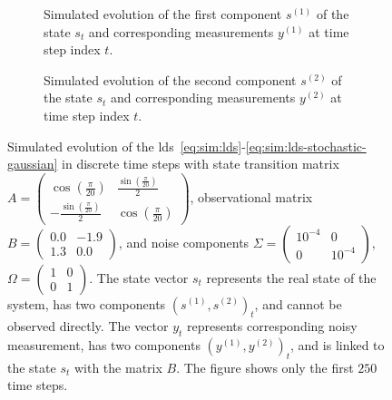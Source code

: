 \begin{figure}
  \centering
  \begin{subfigure}[t]{0.475\textwidth}
    \centering
    \caption{Simulated evolution of the first component $s^{(1)}$ of the state $s_t$ and corresponding measurements $y^{(1)}$ at time step index $t$.}
    \label{fig:sim:rotating_example_state_1}
  \end{subfigure}
  \hfill
  \begin{subfigure}[t]{0.475\textwidth}
    \centering
    \caption{Simulated evolution of the second component $s^{(2)}$ of the state $s_t$ and corresponding measurements $y^{(2)}$ at time step index $t$.}
    \label{fig:sim:rotating_example_state_2}
  \end{subfigure}
  \hfill
  \caption{
    Simulated evolution of the \ac{lds}~\eqref{eq:sim:lds}-\eqref{eq:sim:lds-stochastic-gaussian} in discrete time steps with state transition matrix $A =
      \begin{pmatrix}
        \cos(\frac{\pi}{20}) & \frac{\sin(\frac{\pi}{20})}{2} \\ -\frac{\sin(\frac{\pi}{20})}{2} & \cos(\frac{\pi}{20})
      \end{pmatrix}
    $, observational matrix $B =
      \begin{pmatrix}
        0.0 & -1.9 \\ 1.3 & 0.0
      \end{pmatrix}
    $, and noise components $\Sigma =
      \begin{pmatrix}
        10^{-4} & 0 \\ 0 & 10^{-4}
      \end{pmatrix}
    $, $\Omega =
      \begin{pmatrix}
        1 & 0 \\ 0 & 1
      \end{pmatrix}
    $.
    The state vector $s_t$ represents the real state of the system, has two components $(s^{(1)},
      s^{(2)})_t$, and cannot be observed directly.
    The vector $y_t$ represents corresponding noisy measurement, has two components $(y^{(1)},
      y^{(2)})_t$, and is linked to the state $s_t$ with the matrix $B$.
    The figure shows only the first $250$ time steps.
  }
  \label{fig:sim:rotating_example_states}
\end{figure}

